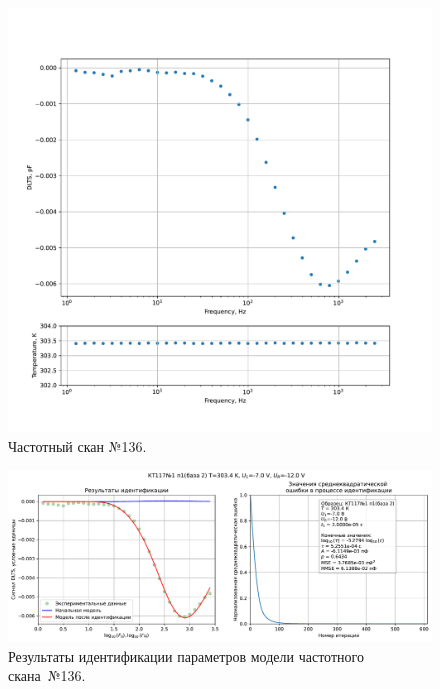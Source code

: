 \begin{figure}[!ht]
    \centering
    \includegraphics[width=1\textwidth]{../plots/КТ117№1_п1(база 2)_2500Гц-1Гц_1пФ_+30С_-7В-12В_100мВ_20мкс_шаг_0,1.pdf}
    \caption{Частотный скан №136.}
    \label{pic:frequency_scan_136}
\end{figure}

\begin{figure}[!ht]
    \centering
    \includegraphics[width=1\textwidth]{../plots/КТ117№1_п1(база 2)_2500Гц-1Гц_1пФ_+30С_-7В-12В_100мВ_20мкс_шаг_0,1_model.pdf}
    \caption{Результаты идентификации параметров модели частотного скана~№136.}
    \label{pic:frequency_scan_model136}
\end{figure}

\pagebreak


